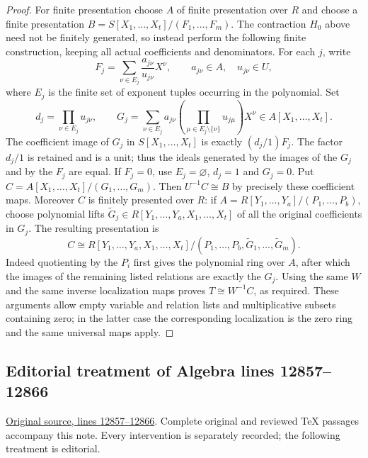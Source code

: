 \begin{proof}
For finite presentation choose $A$ of finite presentation over
$R$ and choose a finite presentation
$B=S[X_1,\ldots,X_t]/(F_1,\ldots,F_m)$.
The contraction $H_0$ above need not be finitely generated,
so instead perform the following finite construction, keeping
all actual coefficients and denominators.
For each $j$, write
$$
F_j=\sum_{\nu\in E_j}\frac{a_{j\nu}}{u_{j\nu}}X^\nu,
\qquad a_{j\nu}\in A,\quad u_{j\nu}\in U,
$$
where $E_j$ is the finite set of exponent tuples occurring in
the polynomial. Set
$$
d_j=\prod_{\nu\in E_j}u_{j\nu},\qquad
G_j=\sum_{\nu\in E_j}
a_{j\nu}\left(\prod_{\mu\in E_j\setminus\{\nu\}}
u_{j\mu}\right)X^\nu\in A[X_1,\ldots,X_t].
$$
The coefficient image of $G_j$ in $S[X_1,\ldots,X_t]$ is
exactly $(d_j/1)F_j$. The factor $d_j/1$ is retained and is
a unit; thus the ideals generated by the images of the $G_j$
and by the $F_j$ are equal. If $F_j=0$, use $E_j=\varnothing$,
$d_j=1$ and $G_j=0$.
Put $C=A[X_1,\ldots,X_t]/(G_1,\ldots,G_m)$.
Then $U^{-1}C\cong B$ by precisely these coefficient maps.
Moreover $C$ is finitely presented over $R$: if
$A=R[Y_1,\ldots,Y_a]/(P_1,\ldots,P_b)$, choose polynomial
lifts $\widetilde G_j\in R[Y_1,\ldots,Y_a,X_1,\ldots,X_t]$
of all the original coefficients in $G_j$.
The resulting presentation is
$$
C\cong R[Y_1,\ldots,Y_a,X_1,\ldots,X_t]
/(P_1,\ldots,P_b,\widetilde G_1,\ldots,\widetilde G_m).
$$
Indeed quotienting by the $P_i$ first gives the polynomial
ring over $A$, after which the images of the remaining listed
relations are exactly the $G_j$.
Using the same $W$ and the same inverse localization maps proves
$T\cong W^{-1}C$, as required. These arguments allow empty
variable and relation lists and multiplicative subsets containing
zero; in the latter case the corresponding localization is the
zero ring and the same universal maps apply.
\end{proof}


\subsection{Editorial treatment of Algebra lines 12857--12866}

\hypertarget{algebra-context-172}{}

\noindent\href{https://github.com/stacks/stacks-project/blob/a04446e57ec1fbc252a871afcec7752fb2807b14/algebra.tex\#L12857}{Original source, lines 12857--12866}. Complete original and reviewed TeX passages accompany this note. Every intervention is separately recorded; the following treatment is editorial.


